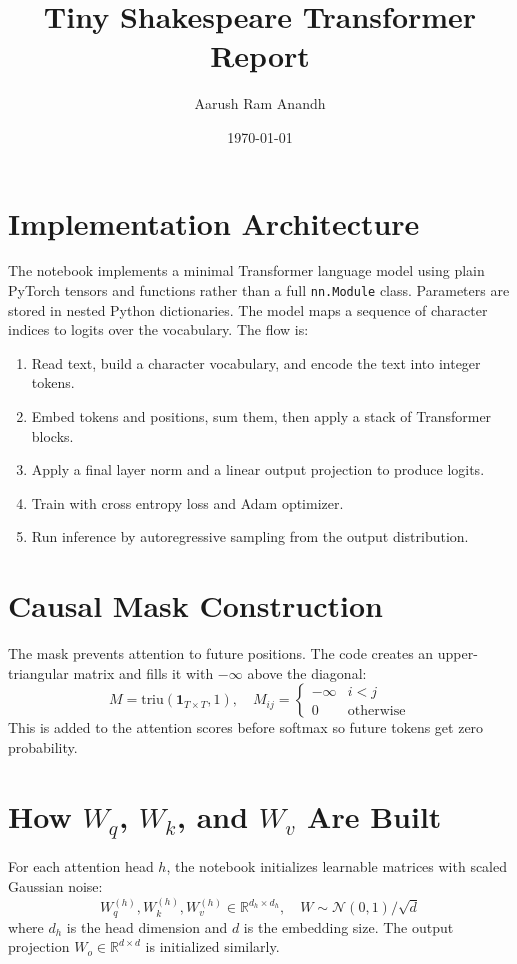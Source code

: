 \documentclass{article}
\title{Tiny Shakespeare Transformer Report}
\author{Aarush Ram Anandh}
\date{\today}
\begin{document}
\maketitle

\section*{Implementation Architecture}
The notebook implements a minimal Transformer language model using plain PyTorch tensors and functions rather than a full \texttt{nn.Module} class. Parameters are stored in nested Python dictionaries. The model maps a sequence of character indices to logits over the vocabulary. The flow is:
\begin{enumerate}
	\item Read text, build a character vocabulary, and encode the text into integer tokens.
	\item Embed tokens and positions, sum them, then apply a stack of Transformer blocks.
	\item Apply a final layer norm and a linear output projection to produce logits.
	\item Train with cross entropy loss and Adam optimizer.
	\item Run inference by autoregressive sampling from the output distribution.
\end{enumerate}

\section*{Causal Mask Construction}
The mask prevents attention to future positions. The code creates an upper-triangular matrix and fills it with $-\infty$ above the diagonal:
\[
M = \text{triu}(\mathbf{1}_{T \times T}, 1), \quad M_{ij} = \begin{cases}-\infty & i < j \\ 0 & \text{otherwise}\end{cases}
\]
This is added to the attention scores before softmax so future tokens get zero probability.

\section*{How $W_q$, $W_k$, and $W_v$ Are Built}
For each attention head $h$, the notebook initializes learnable matrices with scaled Gaussian noise:
\[
W_q^{(h)}, W_k^{(h)}, W_v^{(h)} \in \mathbb{R}^{d_h \times d_h}, \quad W \sim \mathcal{N}(0, 1) / \sqrt{d}
\]
where $d_h$ is the head dimension and $d$ is the embedding size. The output projection $W_o \in \mathbb{R}^{d \times d}$ is initialized similarly.
\end{document}
